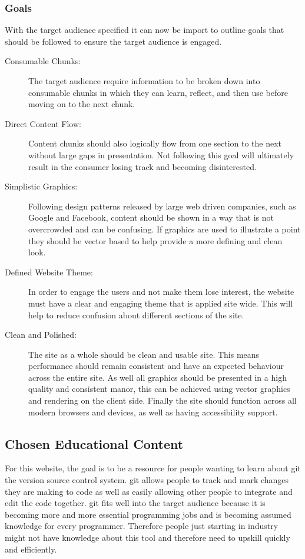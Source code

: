 \subsubsection{Goals}\label{sec:goals}
With the target audience specified it can now be import to outline goals that should be followed to ensure the target audience is engaged.
\begin{description}
	\item[Consumable Chunks:] The target audience require information to be broken down into consumable chunks in which they can learn, reflect, and then use before moving on to the next chunk.
	\item[Direct Content Flow:] Content chunks should also logically flow from one section to the next without large gaps in presentation. Not following this goal will ultimately result in the consumer losing track and becoming disinterested.
	\item[Simplistic Graphics:] Following design patterns released by large web driven companies, such as Google and Facebook, content should be shown in a way that is not overcrowded and can be confusing. If graphics are used to illustrate a point they should be vector based to help provide a more defining and clean look.
	\item[Defined Website Theme:] In order to engage the users and not make them lose interest, the website must have a clear and engaging theme that is applied site wide. This will help to reduce confusion about different sections of the site.
	\item[Clean and Polished:] The site as a whole should be clean and usable site. This means performance should remain consistent and have an expected behaviour across the entire site. As well all graphics should be presented in a high quality and consistent manor, this can be achieved using vector graphics and rendering on the client side. Finally the site should function across all modern browsers and devices, as well as having accessibility support.
\end{description}


\subsection{Chosen Educational Content}\label{sec:content}
For this website, the goal is to be a resource for people wanting to learn about \gls{git} the version source control system. \Gls{git} allows people to track and mark changes they are making to code as well as easily allowing other people to integrate and edit the code together. \Gls{git} fits well into the target audience because it is becoming more and more essential programming jobs and is becoming assumed knowledge for every programmer. Therefore people just starting in industry might not have knowledge about this tool and therefore need to upskill quickly and efficiently.

